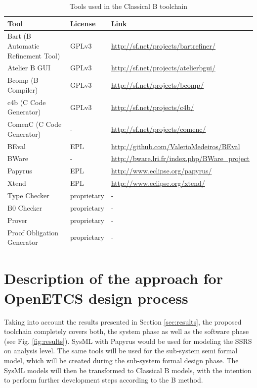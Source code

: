\begin{table}
  \begin{tabular}{ l | l | l }
    Tool                               & License & Link \\ 
    \hline \hline
    Bart (B Automatic Refinement Tool) & GPLv3 & \url{http://sf.net/projects/bartrefiner/} \\ \hline
    Atelier B GUI                      & GPLv3 & \url{http://sf.net/projects/atelierbgui/} \\ \hline
    Bcomp (B Compiler)                 & GPLv3 & \url{http://sf.net/projects/bcomp/} \\ \hline
    c4b (C Code Generator)             & GPLv3 & \url{http://sf.net/projects/c4b/} \\ \hline
    ComenC (C Code Generator)          & -     & \url{http://sf.net/projects/comenc/} \\ \hline
    BEval                              & EPL   & \url{http://github.com/ValerioMedeiros/BEval} \\ \hline
    BWare                              & -     & \url{http://bware.lri.fr/index.php/BWare_project} \\ \hline
    Papyrus                            & EPL   & \url{http://www.eclipse.org/papyrus/} \\ \hline
    Xtend                              & EPL   & \url{http://www.eclipse.org/xtend/} \\ \hline
    Type Checker                       & proprietary & - \\ \hline
    B0 Checker                         & proprietary & - \\ \hline
    Prover                             & proprietary & - \\ \hline
    Proof Obligation Generator         & proprietary & - \\ \hline
    \hline
  \end{tabular}
  \caption{Tools used in the Classical B toolchain}
  \label{tab:classical-b-tools}
\end{table}



\section{Description of the approach for OpenETCS design process}

Taking into account the results presented in Section
\ref{sec:results}, the proposed toolchain completely covers both, the
system phase as well as the software phase (see
Fig. \ref{fig:results}). SysML with Papyrus would be used for modeling
the SSRS on analysis level. The same tools will be used for the
sub-system semi formal model, which will be created during the
sub-system formal design phase. The SysML models will then be
transformed to Classical B models, with the intention to perform
further development steps according to the B method.

